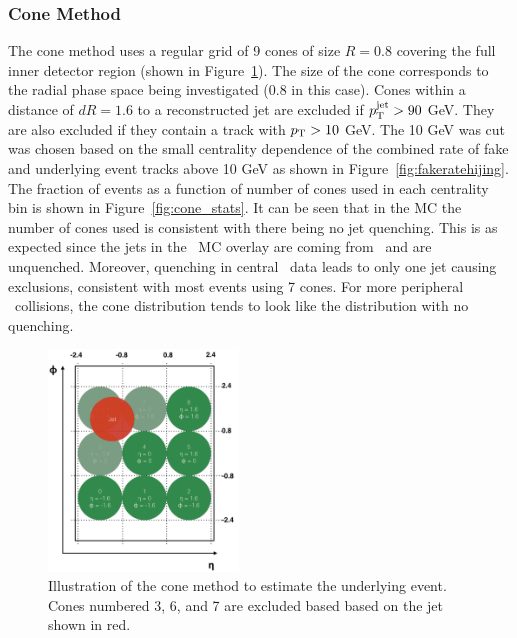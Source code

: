 \subsubsection{Cone Method}
\label{sec:cone_method}
The cone method uses a regular grid of 9 cones of size $R = 0.8$ covering the full inner detector region (shown in Figure~\ref{fig:cone_grid}).
The size of the cone corresponds to the radial phase space being investigated (0.8 in this case).
Cones within a distance of $dR=1.6$ to a reconstructed jet are excluded if $\mbox{$p_{\mathrm{T}}^{\mathrm{jet}}$} > 90$ GeV.
They are also excluded if they contain a track with $\mbox{$p_{\mathrm{T}}$} > 10$ GeV.
The 10 GeV was cut was chosen based on the small centrality dependence of the combined rate of fake and underlying event tracks above 10 GeV as shown in Figure~\ref{fig:fakeratehijing}.
The fraction of events as a function of number of cones used in each centrality bin is shown in Figure~\ref{fig:cone_stats}.
It can be seen that in the MC the number of cones used is consistent with there being no jet quenching.
This is as expected since the jets in the \pbpb\ MC overlay are coming from \pythia\ and are unquenched.
Moreover, quenching in central \pbpb\ data leads to only one jet causing exclusions, consistent with most events using 7 cones.
For more peripheral \pbpb\ collisions, the cone distribution tends to look like the distribution with no quenching.

\begin{figure}
\centering
\includegraphics[width=0.45\textwidth]{figures/main/UE/cone_grid.pdf}
\caption{Illustration of the cone method to estimate the underlying event.
Cones numbered 3, 6, and 7 are excluded based based on the jet shown in red.}
\label{fig:cone_grid}
\end{figure}   

